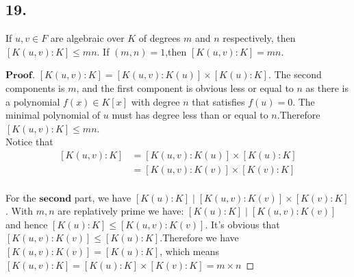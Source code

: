 \documentclass[a4paper, 11pt]{article}
\newenvironment{myprf}
{\renewcommand\qedsymbol{$ $}\begin{proof}[$\mathbf{Proof}$]}
  {\end{proof}}
\begin{document}
 \subsection*{19.}
 If $u,v\in F$ are algebraic over $K$ of degrees $m$ and $n$ respectively, then
 $[K(u,v):K] \leq mn$. If $(m,n)=1$,then $[K(u,v):K]=mn$.
 \begin{myprf}
        $[K(u,v):K]=[K(u,v):K(u)]\times [K(u):K]$. The second components is $m$, and the
        first component is obvious less or equal to $n$ as there is a polynomial $f(x)\in K[x]$
        with degree $n$ that satisfies $f(u)=0$. The minimal polynomial of $u$ must has 
        degree less than or equal to $n$.Therefore $[K(u,v):K] \leq mn$.\\
        Notice that
        $$
        \begin{aligned}
                [K(u,v):K]&=[K(u,v):K(u)]\times [K(u):K]\\
                          &=[K(u,v):K(v)]\times [K(v):K]
        \end{aligned}
        $$
        \vspace{0.3cm}
        \\
        For the $\textbf{second}$ part, 
        we have $[K(u):K]\mid [K(u,v):K(v)]\times [K(v):K]$. With $m,n$ are replatively
        prime we have: $[K(u):K] \mid [K(u,v):K(v)]$ and hence $[K(u):K]\leq 
        [K(u,v):K(v)]$. It's obvious that $[K(u,v):K(v)]\leq [K(u):K]$.Therefore we have
        $[K(u,v):K(v)]=[K(u):K]$, which means $[K(u,v):K]=[K(u):K]\times [K(v):K]=m\times
        n$
 

\end{myprf}
\end{document}
